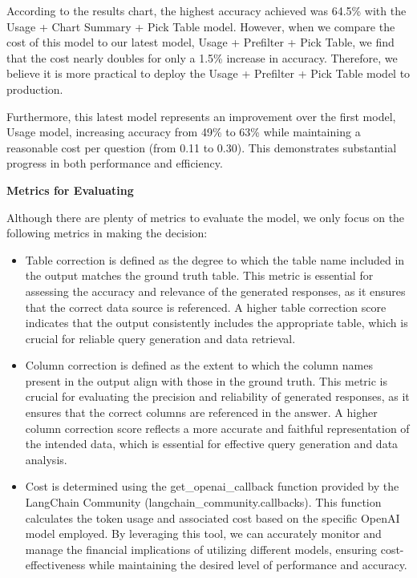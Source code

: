     According to the results chart, the highest accuracy achieved was 64.5\% with the Usage + Chart Summary + Pick Table model. However, when we compare the cost of this model to our latest model, Usage + Prefilter + Pick Table, we find that the cost nearly doubles for only a 1.5\% increase in accuracy. Therefore, we believe it is more practical to deploy the Usage + Prefilter + Pick Table model to production.

    Furthermore, this latest model represents an improvement over the first model, Usage model, increasing accuracy from 49\% to 63\% while maintaining a reasonable cost per question (from 0.11 to 0.30). This demonstrates substantial progress in both performance and efficiency.
    \vspace{0.5cm}


    \textbf{Metrics for Evaluating}


    Although there are plenty of metrics to evaluate the model, we only focus on the following metrics in making the decision:
    \begin{itemize}
        \item Table correction is defined as the degree to which the table name included in the output matches the ground truth table. This metric is essential for assessing the accuracy and relevance of the generated responses, as it ensures that the correct data source is referenced. A higher table correction score indicates that the output consistently includes the appropriate table, which is crucial for reliable query generation and data retrieval.
        \item Column correction is defined as the extent to which the column names present in the output align with those in the ground truth. This metric is crucial for evaluating the precision and reliability of generated responses, as it ensures that the correct columns are referenced in the answer. A higher column correction score reflects a more accurate and faithful representation of the intended data, which is essential for effective query generation and data analysis.
        \item Cost is determined using the get\_openai\_callback function provided by the LangChain Community (langchain\_community.callbacks). This function calculates the token usage and associated cost based on the specific OpenAI model employed. By leveraging this tool, we can accurately monitor and manage the financial implications of utilizing different models, ensuring cost-effectiveness while maintaining the desired level of performance and accuracy.
    \end{itemize}

